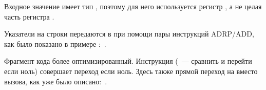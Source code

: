 

Входное значение имеет тип \Tint, поэтому для него используется регистр ,
а не целая часть регистра .

Указатели на строки передаются в \puts при помощи пары инструкций ADRP/ADD, как было показано в примере
\q{\HelloWorldSectionName}:~.




Фрагмент кода более оптимизированный.
Инструкция  (~--- сравнить и перейти если ноль) совершает переход если  ноль.
Здесь также прямой переход на \puts вместо вызова, как уже было описано:~.

